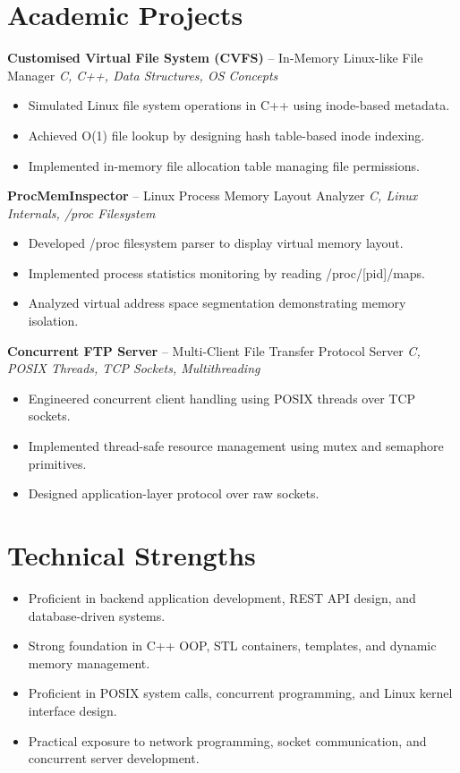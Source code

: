 \documentclass[11pt,a4paper]{article}
\begin{document}
\section{Academic Projects}
\textbf{Customised Virtual File System (CVFS)} -- In-Memory Linux-like File Manager \hfill \textit{C, C++, Data Structures, OS Concepts}
\begin{itemize}
  \item Simulated Linux file system operations in C++ using inode-based metadata.
  \item Achieved O(1) file lookup by designing hash table-based inode indexing.
  \item Implemented in-memory file allocation table managing file permissions.
\end{itemize}
\vspace{6pt}
\textbf{ProcMemInspector} -- Linux Process Memory Layout Analyzer \hfill \textit{C, Linux Internals, /proc Filesystem}
\begin{itemize}
  \item Developed /proc filesystem parser to display virtual memory layout.
  \item Implemented process statistics monitoring by reading /proc/[pid]/maps.
  \item Analyzed virtual address space segmentation demonstrating memory isolation.
\end{itemize}
\vspace{6pt}
\textbf{Concurrent FTP Server} -- Multi-Client File Transfer Protocol Server \hfill \textit{C, POSIX Threads, TCP Sockets, Multithreading}
\begin{itemize}
  \item Engineered concurrent client handling using POSIX threads over TCP sockets.
  \item Implemented thread-safe resource management using mutex and semaphore primitives.
  \item Designed application-layer protocol over raw sockets.
\end{itemize}
\section{Technical Strengths}
\begin{itemize}
  \item Proficient in backend application development, REST API design, and database-driven systems.
  \item Strong foundation in C++ OOP, STL containers, templates, and dynamic memory management.
  \item Proficient in POSIX system calls, concurrent programming, and Linux kernel interface design.
  \item Practical exposure to network programming, socket communication, and concurrent server development.
\end{itemize}
\end{document}
